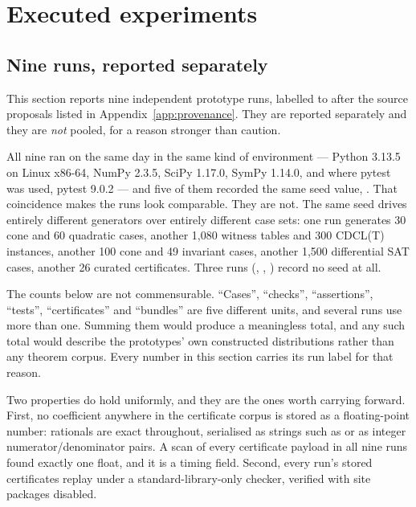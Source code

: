 \section{Executed experiments}
\label{sec:experiments}

\subsection{Nine runs, reported separately}

This section reports nine independent prototype runs, labelled 
to  after the source proposals listed in
Appendix~\ref{app:provenance}. They are reported separately and they are
\emph{not} pooled, for a reason stronger than caution.

All nine ran on the same day in the same kind of environment --- Python 3.13.5
on Linux x86-64, NumPy 2.3.5, SciPy 1.17.0, SymPy 1.14.0, and where pytest was
used, pytest 9.0.2 --- and five of them recorded the same seed value,
. That coincidence makes the runs look comparable. They are not.
The same seed drives entirely different generators over entirely different case
sets: one run generates 30 cone and 60 quadratic cases, another 1{,}080 witness
tables and 300 CDCL(T) instances, another 100 cone and 49 invariant cases,
another 1{,}500 differential SAT cases, another 26 curated certificates. Three
runs (, , ) record no seed at all.

\begin{remark}
The counts below are not commensurable. ``Cases'', ``checks'', ``assertions'',
``tests'', ``certificates'' and ``bundles'' are five different units, and several
runs use more than one. Summing them would produce a meaningless total, and any
such total would describe the prototypes' own constructed distributions rather
than any theorem corpus. Every number in this section carries its run label for
that reason.
\end{remark}

Two properties do hold uniformly, and they are the ones worth carrying forward.
First, no coefficient anywhere in the certificate corpus is stored as a
floating-point number: rationals are exact throughout, serialised as strings
such as  or as integer numerator/denominator pairs. A scan of
every certificate payload in all nine runs found exactly one float, and it is a
timing field. Second, every run's stored certificates replay under a
standard-library-only checker, verified with site packages disabled.

